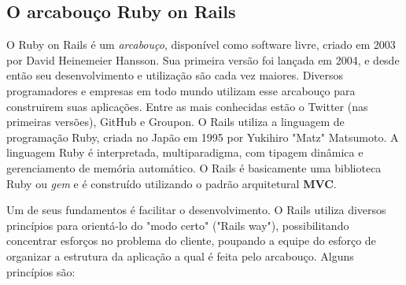 \subsection{O arcabouço Ruby on Rails}

O Ruby on Rails é um \textit{arcabouço}, disponível como software livre, criado em 2003 por David Heinemeier Hansson.
%
Sua primeira versão foi lançada em 2004, e desde então seu desenvolvimento e utilização são cada vez maiores.
%
Diversos programadores e empresas em todo mundo utilizam esse arcabouço para construirem suas aplicações. Entre as mais conhecidas estão o Twitter (nas primeiras versões), GitHub e Groupon. 
%
O Rails utiliza a linguagem de programação Ruby, criada no Japão em 1995 por Yukihiro "Matz" Matsumoto. A linguagem Ruby é interpretada, multiparadigma, com tipagem dinâmica e gerenciamento de memória automático. O Rails é basicamente uma biblioteca Ruby ou \textit{gem} e é construído utilizando o padrão arquitetural \textbf{MVC}.

Um de seus fundamentos é facilitar o desenvolvimento. O Rails utiliza diversos princípios para orientá-lo do "modo certo" ("Rails way"), possibilitando concentrar esforços no problema do cliente, poupando a equipe do esforço de organizar a estrutura da aplicação a qual é feita pelo arcabouço. Alguns princípios são:

